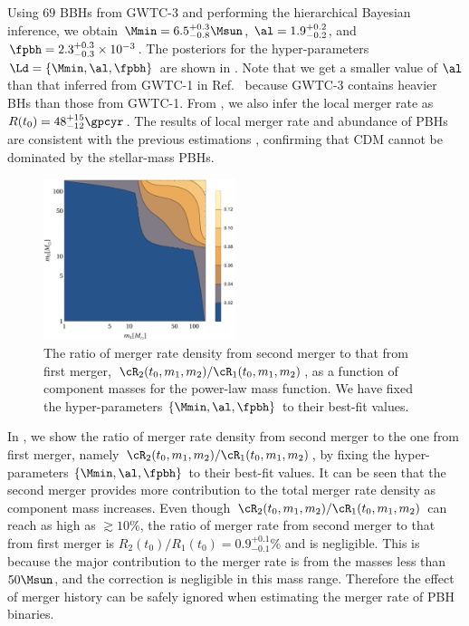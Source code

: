 \documentclass[
reprint,           %
superscriptaddress,%
amsmath,           %
amssymb,           %
aps,               %
prd,               %
notitlepage,       %
longbibliography,  %
floatfix,          %
nofootinbib,
]{revtex4-1}
\begin{document}
Using $69$ BBHs from GWTC-3 and performing the hierarchical Bayesian inference, we obtain $\Mmin = 6.5^{+0.3}_{-0.8} \Msun$, $\al = 1.9^{+0.2}_{-0.2}$, and $\fpbh = 2.3^{+0.3}_{-0.3} \times 10^{-3}$. The posteriors for the hyper-parameters $\Ld = \{\Mmin, \al, \fpbh\}$ are shown in . Note that we get a smaller value of $\al$ than that inferred from GWTC-1 in Ref.~\cite{Wu:2020drm} because GWTC-3 contains heavier BHs than those from GWTC-1. From , we also infer the local merger rate as $R(t_0) = 48^{+15}_{-12} \gpcyr$. The results of local merger rate and abundance of PBHs are consistent with the previous estimations \cite{Sasaki:2016jop,Ali-Haimoud:2017rtz,Chen:2018czv,Chen:2018rzo,Chen:2019irf,Wu:2020drm,Chen:2021nxo,Chen:2022fda}, confirming that CDM cannot be dominated by the stellar-mass PBHs.

\begin{figure}[htbp!]
	\centering
	\includegraphics[width=0.5\textwidth]{ratio-power.pdf}
	\caption{\label{ratio-power}The ratio of merger rate density from second merger to that from first merger, $\cR_2(t_0, m_1, m_2)/\cR_1(t_0, m_1, m_2)$, as a function of component masses for the power-law mass function. We have fixed the hyper-parameters $\{\Mmin, \al, \fpbh\}$ to their best-fit values.}
\end{figure}

In , we show the ratio of merger rate density from second merger to the one from first merger, namely $\cR_2(t_0, m_1, m_2)/\cR_1(t_0, m_1, m_2)$, by fixing the hyper-parameters $\{\Mmin, \al, \fpbh\}$ to their best-fit values. It can be seen that the second merger provides more contribution to the total merger rate density as component mass increases. Even though $\cR_2(t_0, m_1, m_2)/\cR_1(t_0, m_1, m_2)$ can reach as high as $\gtrsim 10\%$, the ratio of merger rate from second merger to that from first merger is $R_2(t_0)/R_1(t_0) = 0.9^{+0.1}_{-0.1}\%$ and is negligible. This is because the major contribution to the merger rate is from the masses less than $50\Msun$, and the correction is negligible in this mass range. Therefore the effect of merger history can be safely ignored when estimating the merger rate of PBH binaries.
\end{document}
